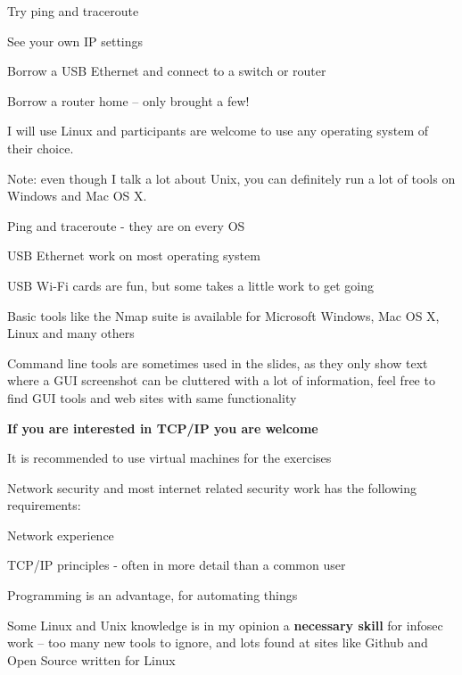 \documentclass[Screen16to9,17pt]{foils}
\begin{document}
\begin{list2}
\item Try ping and traceroute
\item See your own IP settings
\item Borrow a USB Ethernet and connect to a switch or router
\item Borrow a router home -- only brought a few!
\end{list2}


I will use Linux and participants are welcome to use any operating system of their choice.

Note: even though I talk a lot about Unix, you can definitely run a lot of tools on Windows and Mac OS X.

\begin{list2}
\item Ping and traceroute - they are on every OS
\item USB Ethernet work on most operating system
\item USB Wi-Fi cards are fun, but some takes a little work to get going
\item Basic tools like the Nmap suite is available for Microsoft Windows, Mac OS X, Linux and many others
\end{list2}

Command line tools are sometimes used in the slides, as they only show text where a GUI screenshot can be cluttered with a lot of information, feel free to find GUI tools and web sites with same functionality




\textbf{\LARGE If you are interested in TCP/IP you are welcome}

\vskip 1cm
\begin{list1}
\item It is recommended to use virtual machines for the exercises
\item Network security and most internet related security work has the following requirements:
\begin{list2}
\item Network experience
\item TCP/IP principles - often in more detail than a common user
\item Programming is an advantage, for automating things
\item Some Linux and Unix knowledge is in my opinion a {\bf necessary skill} for infosec work -- too many new tools to ignore, and lots found at sites like Github and Open Source written for Linux
\end{list2}
\end{list1}
\end{document}
